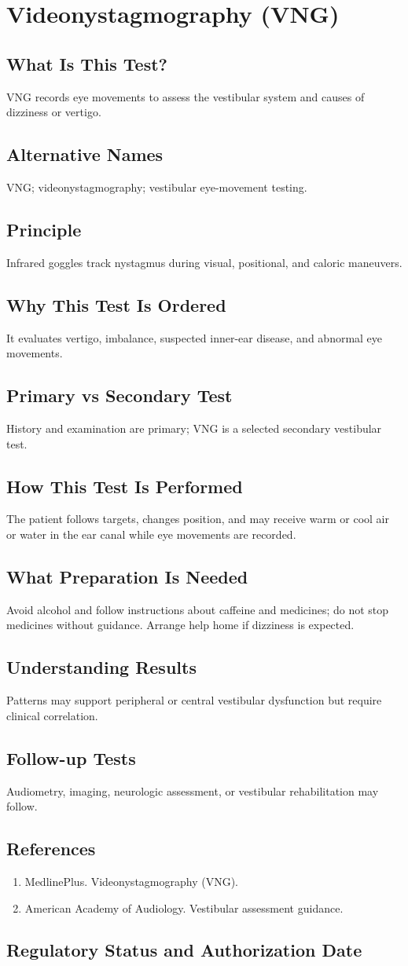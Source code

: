 \chapter{Videonystagmography (VNG)}
\section*{What Is This Test?} VNG records eye movements to assess the vestibular system and causes of dizziness or vertigo.\section*{Alternative Names} VNG; videonystagmography; vestibular eye-movement testing.\section*{Principle} Infrared goggles track nystagmus during visual, positional, and caloric maneuvers.\section*{Why This Test Is Ordered} It evaluates vertigo, imbalance, suspected inner-ear disease, and abnormal eye movements.\section*{Primary vs Secondary Test} History and examination are primary; VNG is a selected secondary vestibular test.\section*{How This Test Is Performed} The patient follows targets, changes position, and may receive warm or cool air or water in the ear canal while eye movements are recorded.\section*{What Preparation Is Needed} Avoid alcohol and follow instructions about caffeine and medicines; do not stop medicines without guidance. Arrange help home if dizziness is expected.\section*{Understanding Results} Patterns may support peripheral or central vestibular dysfunction but require clinical correlation.\section*{Follow-up Tests} Audiometry, imaging, neurologic assessment, or vestibular rehabilitation may follow.\section*{References} \begin{enumerate}\item MedlinePlus. Videonystagmography (VNG).\item American Academy of Audiology. Vestibular assessment guidance.\end{enumerate}\clearpage\section*{Regulatory Status and Authorization Date}\clearpage
